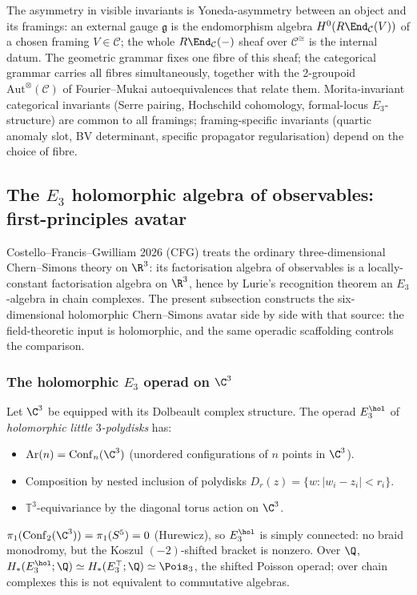 \begin{remark}
\label{rem:per-grammar-invariants-treatise}
The asymmetry in visible invariants is Yoneda-asymmetry between an object and its framings: an external gauge $\mathfrak{g}$ is the endomorphism algebra $H^0(R\End_{\mathcal{C}}(V))$ of a chosen framing $V \in \mathcal{C}$; the whole $R\End_{\mathcal{C}}(-)$ sheaf over $\mathcal{C}^{\cong}$ is the internal datum. The geometric grammar fixes one fibre of this sheaf; the categorical grammar carries all fibres simultaneously, together with the 2-groupoid $\mathrm{Aut}^\otimes(\mathcal{C})$ of Fourier--Mukai autoequivalences that relate them. Morita-invariant categorical invariants (Serre pairing, Hochschild cohomology, formal-locus $E_3$-structure) are common to all framings; framing-specific invariants (quartic anomaly slot, BV determinant, specific propagator regularisation) depend on the choice of fibre.
\end{remark}

\subsection{The $E_3$ holomorphic algebra of observables: first-principles avatar}
\label{subsec:E3-algebra-of-observables-avatar}

Costello--Francis--Gwilliam 2026 (CFG) treats the ordinary three-dimensional Chern--Simons theory on $\R^3$: its factorisation algebra of observables is a locally-constant factorisation algebra on $\R^3$, hence by Lurie's recognition theorem an $E_3$-algebra in chain complexes. The present subsection constructs the six-dimensional holomorphic Chern--Simons avatar side by side with that source: the field-theoretic input is holomorphic, and the same operadic scaffolding controls the comparison.

\subsubsection{The holomorphic $E_3$ operad on $\C^3$}
\label{sssec:holE3-operad}

\begin{definition}
\label{def:holE3-operad-avatar}
Let $\C^3$ be equipped with its Dolbeault complex structure. The operad $E_3^{\hol}$ of \emph{holomorphic little $3$-polydisks} has:
\begin{itemize}
\item $\operatorname{Ar}(n) = \mathrm{Conf}_n(\C^3)$ (unordered configurations of $n$ points in $\C^3$).
\item Composition by nested inclusion of polydisks $D_r(z) = \{w : |w_i - z_i| < r_i\}$.
\item $\mathbb{T}^3$-equivariance by the diagonal torus action on $\C^3$.
\end{itemize}
$\pi_1(\mathrm{Conf}_2(\C^3)) = \pi_1(S^5) = 0$ (Hurewicz), so $E_3^{\hol}$ is simply connected: no braid monodromy, but the Koszul $(-2)$-shifted bracket is nonzero. Over $\Q$, $H_*(E_3^{\hol}; \Q) \simeq H_*(E_3^{\top}; \Q) \simeq \Pois_3$, the shifted Poisson operad; over chain complexes this is not equivalent to commutative algebras.
\end{definition}

